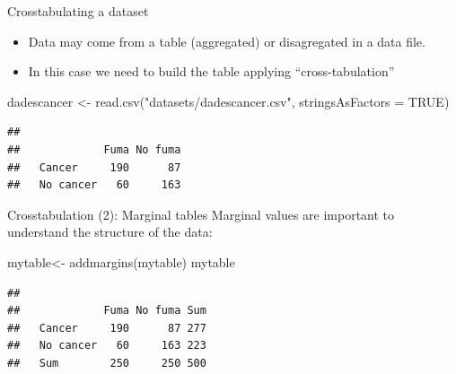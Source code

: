\documentclass[
  ignorenonframetext,
]{beamer}
\newenvironment{Shaded}{\begin{snugshade}}{\end{snugshade}}
\newcommand{\AttributeTok}[1]{\textcolor[rgb]{0.77,0.63,0.00}{#1}}
\newcommand{\CommentTok}[1]{\textcolor[rgb]{0.56,0.35,0.01}{\textit{#1}}}
\newcommand{\ConstantTok}[1]{\textcolor[rgb]{0.00,0.00,0.00}{#1}}
\newcommand{\FunctionTok}[1]{\textcolor[rgb]{0.00,0.00,0.00}{#1}}
\newcommand{\NormalTok}[1]{#1}
\newcommand{\OtherTok}[1]{\textcolor[rgb]{0.56,0.35,0.01}{#1}}
\newcommand{\SpecialCharTok}[1]{\textcolor[rgb]{0.00,0.00,0.00}{#1}}
\newcommand{\StringTok}[1]{\textcolor[rgb]{0.31,0.60,0.02}{#1}}
\begin{document}
\begin{frame}[fragile]{Crosstabulating a dataset}
\protect\hypertarget{crosstabulating-a-dataset}{}
\begin{itemize}
\item
  Data may come from a table (aggregated) or disagregated in a data
  file.
\item
  In this case we need to build the table applying ``cross-tabulation''
\end{itemize}

\begin{Shaded}
\begin{Highlighting}[]
\NormalTok{dadescancer }\OtherTok{\textless{}{-}} \FunctionTok{read.csv}\NormalTok{(}\StringTok{"datasets/dadescancer.csv"}\NormalTok{, }
                        \AttributeTok{stringsAsFactors =} \ConstantTok{TRUE}\NormalTok{)}
\end{Highlighting}
\end{Shaded}

\begin{Shaded}
\end{Shaded}

\begin{verbatim}
##            
##             Fuma No fuma
##   Cancer     190      87
##   No cancer   60     163
\end{verbatim}
\end{frame}

\begin{frame}[fragile]{Crosstabulation (2): Marginal tables}
\protect\hypertarget{crosstabulation-2-marginal-tables}{}
Marginal values are important to understand the structure of the data:

\begin{Shaded}
\begin{Highlighting}[]
\NormalTok{mytable}\OtherTok{\textless{}{-}} \FunctionTok{addmargins}\NormalTok{(mytable)}
\NormalTok{mytable}
\end{Highlighting}
\end{Shaded}

\begin{verbatim}
##            
##             Fuma No fuma Sum
##   Cancer     190      87 277
##   No cancer   60     163 223
##   Sum        250     250 500
\end{verbatim}
\end{frame}
\end{document}
